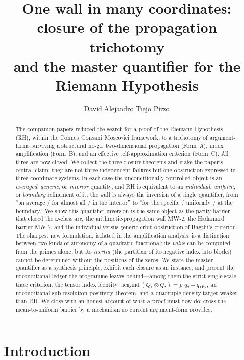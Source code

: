 \documentclass[11pt]{amsart}
\title[One Wall in Many Coordinates]{One wall in many coordinates:\\
closure of the propagation trichotomy\\
and the master quantifier for the Riemann Hypothesis}
\author{David Alejandro Trejo Pizzo}
\theoremstyle{definition}
\theoremstyle{remark}
\newcommand{\negind}{\operatorname{neg.ind}}
\begin{document}
\nocite{bgTitchmarsh,bgEdwards,bgConrey03,bgBombieri00,bgConnes99,bgdeBranges,bgMont73,bgBK}

\begin{abstract}
The companion papers \cite{P41,P42} reduced the search for a proof of the
Riemann Hypothesis (RH), within the Connes--Consani--Moscovici framework, to
a trichotomy of argument-forms surviving a structural no-go: two-dimensional
propagation (Form~A), index amplification (Form~B), and an effective
self-approximation criterion (Form~C). All three are now closed. We collect
the three closure theorems and make the paper's central claim: they are not
three independent failures but one obstruction expressed in three coordinate
systems. In each case the unconditionally controlled object is an
\emph{averaged}, \emph{generic}, or \emph{interior} quantity, and RH is
equivalent to an \emph{individual}, \emph{uniform}, or \emph{boundary}
refinement of it; the wall is always the inversion of a single quantifier,
from ``on average / for almost all / in the interior'' to ``for the specific
/ uniformly / at the boundary.'' We show this quantifier inversion is the
same object as the parity barrier that closed the $\omega$-class arc, the
arithmetic-propagation wall MW-2, the Hadamard barrier MW-7, and the
individual-versus-generic orbit obstruction of Bagchi's criterion. The
sharpest new formulation, isolated in the amplification analysis, is a
distinction between two kinds of autonomy of a quadratic functional: its
\emph{value} can be computed from the primes alone, but its \emph{inertia}
(the partition of its negative index into blocks) cannot be determined
without the positions of the zeros. We state the master quantifier as a
synthesis principle, exhibit each closure as an instance, and present the
unconditional ledger the programme leaves behind---among them the
strict single-scale trace criterion, the tensor index identity
$\negind(Q_1\otimes Q_2)=p_1q_2+q_1p_2$, an unconditional sub-resolution
positivity theorem, and a quadruple-density target weaker than RH. We close
with an honest account of what a proof must now do: cross the mean-to-uniform
barrier by a mechanism no current argument-form provides.
\end{abstract}

\maketitle
\tableofcontents
\newpage

\section{Introduction}
\end{document}
